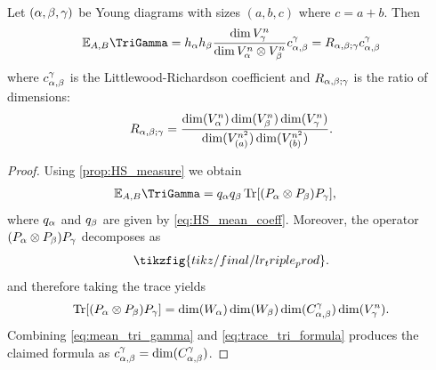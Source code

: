 \documentclass[notitlepage, 10pt]{article}
\begin{document}
\begin{prop}
    \label{prop:tri_HS_mean}
    Let $(\alpha,\beta,\gamma)$ be Young diagrams with sizes $(a,b,c)$ where $c=a+b$. Then
    \begin{equation}
        \mathbb E_{A,B}\TriGamma = h_{\ya}h_{\yb}\frac{\dim V_{\yc}^{n}}{\dim V_{\ya}^{n} \ot V_{\yb}^{n}}c^{\yc}_{\ya,\yb} = R_{\ya,\yb;\yc}c^{\yc}_{\ya,\yb}
    \end{equation}
    where $c^{\gamma}_{\alpha,\beta}$ is the Littlewood-Richardson coefficient and $R_{\alpha,\beta;\gamma}$ is the ratio of dimensions:
    \begin{equation}
        R_{\alpha,\beta;\gamma} = \frac{\dim(V_{\alpha}^n)\dim(V_{\beta}^n)\dim(V_{\gamma}^{n})}{\dim(V_{(a)}^{n^2})\dim(V_{(b)}^{n^2})}.
    \end{equation}
\end{prop}
\begin{proof}
    Using \cref{prop:HS_measure} we obtain
   \begin{align}
        \mathbb E_{A,B}\TriGamma
        &= q_{\ya}q_{\yb}\Tr[(P_{\ya}\ot P_{\yb}) P_{\yc}],
        \label{eq:mean_tri_gamma}
    \end{align}
    where $q_{\alpha}$ and $q_{\beta}$ are given by \cref{eq:HS_mean_coeff}.
    Moreover, the operator $(P_{\alpha}\otimes P_{\beta}) P_{\gamma}$ decomposes as
    \begin{equation}
        \label{eq:lr_triple_prod}
        \tikzfig{tikz/final/lr_triple_prod}.
    \end{equation}
    and therefore taking the trace yields
    \begin{equation}
        \operatorname{Tr}[(P_{\alpha}\otimes P_{\beta}) P_{\gamma}] = \dim(W_{\alpha})\dim(W_{\beta})\dim(C_{\alpha,\beta}^{\gamma})\dim(V_{\gamma}^{n}).
        \label{eq:trace_tri_formula}
    \end{equation}
    Combining \cref{eq:mean_tri_gamma} and \cref{eq:trace_tri_formula} produces the claimed formula as $c_{\alpha,\beta}^{\gamma} = \dim(C_{\alpha,\beta}^{\gamma})$.
\end{proof}
\end{document}
